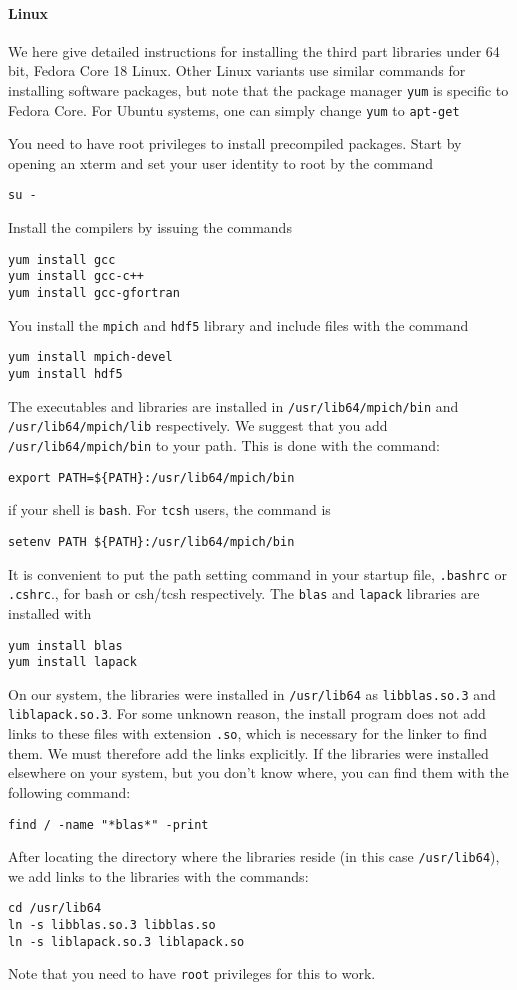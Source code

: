 \documentclass[11pt]{article}
\begin{document}
\paragraph{Linux}
We here give detailed instructions for installing the third part libraries under 64 bit, Fedora Core 18 Linux. Other Linux variants use similar commands for installing software packages, but note that the package manager \verb+yum+ is specific to Fedora Core. For Ubuntu systems, one can simply change \verb+yum+ to \verb+apt-get+

You need to have root privileges to install precompiled packages. Start by opening an xterm and set your user identity to root by the command
\begin{verbatim}
su -
\end{verbatim}
Install the compilers by issuing the commands
\begin{verbatim}
yum install gcc
yum install gcc-c++
yum install gcc-gfortran
\end{verbatim}
You install the \verb+mpich+ and \verb+hdf5+ library and include files with the command
\begin{verbatim}
yum install mpich-devel
yum install hdf5
\end{verbatim}

The executables and libraries are installed in \verb+/usr/lib64/mpich/bin+ and  \verb+/usr/lib64/mpich/lib+ respectively. We suggest that you add \verb+/usr/lib64/mpich/bin+ to your path. This is done with the command:
\begin{verbatim}
export PATH=${PATH}:/usr/lib64/mpich/bin
\end{verbatim}
if your shell is \verb+bash+. For \verb+tcsh+ users, the command is
\begin{verbatim}
setenv PATH ${PATH}:/usr/lib64/mpich/bin
\end{verbatim}
It is convenient to put the path setting command in your startup file, \verb+.bashrc+ or \verb+.cshrc+., for bash or csh/tcsh respectively.
The \verb+blas+ and \verb+lapack+ libraries are installed with
\begin{verbatim}
yum install blas
yum install lapack
\end{verbatim}
On our system, the libraries were installed in \verb+/usr/lib64+ as \verb+libblas.so.3+ and \verb+liblapack.so.3+. For some unknown reason, the install program does not add links to these files with extension \verb+.so+, which is necessary for the linker to find them. We must therefore add the links explicitly. If the libraries were installed elsewhere on your system, but you don't know where, you can find them with the following command:
\begin{verbatim}
find / -name "*blas*" -print
\end{verbatim}
After locating the directory where the libraries reside (in this case \verb+/usr/lib64+), we add
links to the libraries with the commands:
\begin{verbatim}
cd /usr/lib64
ln -s libblas.so.3 libblas.so
ln -s liblapack.so.3 liblapack.so
\end{verbatim}
Note that you need to have \verb+root+ privileges for this to work.
\end{document}
